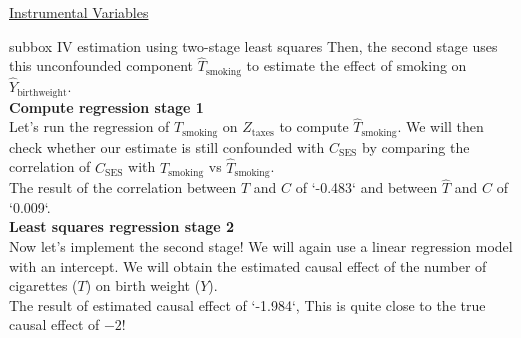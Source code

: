 \begin{textbox}{\href{https://compneuro.neuromatch.io/tutorials/W3D5_NetworkCausality/student/W3D5_Tutorial4.html}{Instrumental Variables }   }
\begin{subbox}{subbox}{ IV estimation using two-stage least squares
}
Then, the second stage uses this unconfounded component $\hat{T}_{\text{smoking}}$ to estimate the effect of smoking on $\hat{Y}_{\text{birthweight}}$. \\

\textbf{Compute regression stage 1}\\
Let's run the regression of $T_{\text{smoking}}$ on $Z_\text{taxes}$ to compute $\hat{T}_{\text{smoking}}$. We will then check whether our estimate is still confounded with $C_{\text{SES}}$ by comparing the correlation of $C_{\text{SES}}$  with $T_{\text{smoking}}$ vs $\hat{T}_{\text{smoking}}$.\\
The result of the correlation between $T$ and $C$ of `-0.483` and between $\hat{T}$ and $C$ of `0.009`.\\

\textbf{Least squares regression stage 2}\\
Now let's implement the second stage! We will again use a linear regression model with an intercept. We will obtain the estimated causal effect of the number of cigarettes ($T$) on birth weight ($Y$).\\

The result of estimated causal effect of `-1.984`, This is quite close to the true causal effect of $-2$!

\end{subbox}
\end{textbox}
